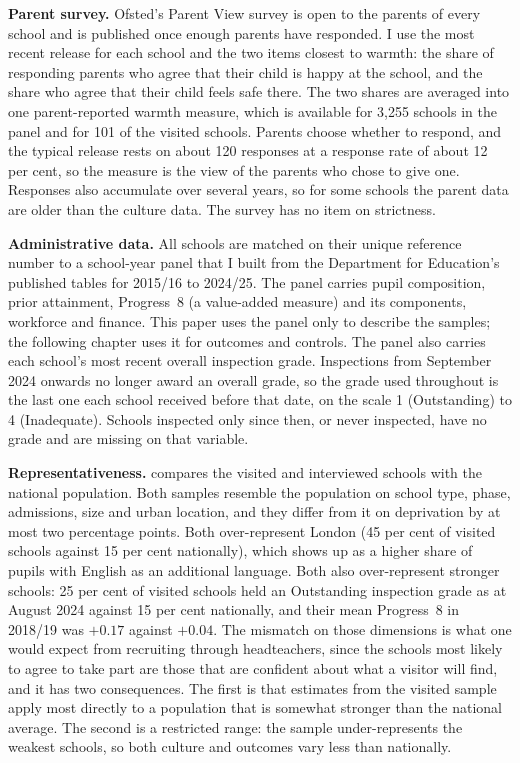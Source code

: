 \textbf{Parent survey.} Ofsted's Parent View survey is open to the parents
of every school and is published once enough parents have responded. I use
the most recent release for each school and the two items closest to
warmth: the share of responding parents who agree that their child is happy
at the school, and the share who agree that their child feels safe there.
The two shares are averaged into one parent-reported warmth measure, which
is available for 3,255 schools in the panel and for 101 of the visited
schools. Parents choose whether to respond, and the typical release rests on about 120 responses at a response rate of about 12
per cent, so the measure is the view of the parents who chose to give one. Responses also accumulate over several years,
so for some schools the parent data are older than the culture data. The survey has no item on strictness.

\textbf{Administrative data.} All schools are matched on their unique
reference number to a school-year panel that I built from the Department for
Education's published tables for 2015/16 to 2024/25. The panel carries pupil
composition, prior attainment, Progress~8 (a value-added measure) and its components,
workforce and
finance. This paper uses the panel only to describe the samples; the
following chapter uses it for outcomes and controls. The panel also carries
each school's most recent overall inspection grade. Inspections from
September 2024 onwards no longer award an overall grade, so the grade used
throughout is the last one each school received before that date, on the
scale 1 (Outstanding) to 4 (Inadequate). Schools inspected only since then,
or never inspected, have no grade and are missing on that variable.

\textbf{Representativeness.}  compares the
visited and interviewed schools with the national population. Both samples
resemble the population on school type, phase, admissions, size and urban
location, and they differ from it on deprivation by at most two percentage
points. Both over-represent London (45 per cent of visited schools against
15 per cent nationally), which shows up as a higher share of pupils with
English as an additional language. Both also over-represent stronger schools:
25 per cent of visited schools held an Outstanding inspection grade as at
August 2024 against 15 per cent nationally, and their mean Progress~8 in
2018/19 was $+0.17$ against $+0.04$. The mismatch on those dimensions is what one would expect from recruiting through headteachers,
since the schools most likely to agree to take part are those that are
confident about what a visitor will find, and it has two consequences. The first is that
estimates from the visited sample apply most directly to a population that is somewhat stronger than the national average.
The second is a restricted range: the sample under-represents the weakest schools, so both culture and outcomes
vary less than nationally.

